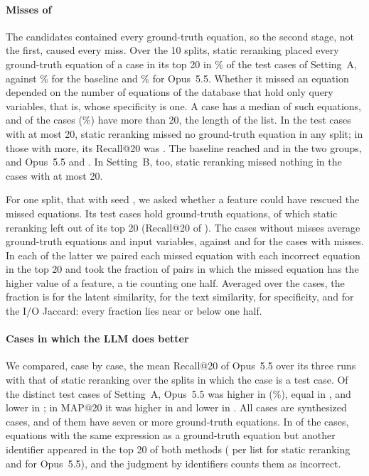 \paragraph{Misses of \ours{}} The candidates contained every ground-truth equation, so
the second stage, not the first, caused every miss. Over the 10 splits, static reranking placed
every ground-truth equation of a case in its top 20 in \PctCompleteAProp\% of the test cases of
Setting~A, against \PctCompleteABase\% for the baseline and \PctCompleteAOpus\% for Opus~5.5.
Whether it missed an equation depended on the number of equations of the database that hold only
query variables, that is, whose specificity is one. A case has a median of \NCovMedianA{} such
equations, and \NCovOverA{} of the \NCases{} cases (\PctCovOverA\%) have more than 20, the length
of the list. In the test cases with at most 20, static reranking missed no ground-truth equation in
any split; in those with more, its Recall@20 was \RecAOverProp. The baseline reached
\RecAWithinBase{} and \RecAOverBase{} in the two groups, and Opus~5.5 \RecAWithinOpus{} and
\RecAOverOpus. In Setting~B, too, static reranking missed nothing in the cases with at most 20.

For one split, that with seed \FirstSeed, we asked whether a feature could have rescued the missed
equations. Its \NErrCases{} test cases hold \NErrGt{} ground-truth equations, of which static
reranking left \NMissed{} out of its top 20 (Recall@20 of \ErrRecall). The \NSolved{} cases without
misses average \MeanKSolved{} ground-truth equations and \MeanInSolved{} input variables, against
\MeanKUnsolved{} and \MeanInUnsolved{} for the \NUnsolved{} cases with misses. In each of the
latter we paired each missed equation with each incorrect equation in the top 20 and took the
fraction of pairs in which the missed equation has the higher value of a feature, a tie counting
one half. Averaged over the cases, the fraction is \RescueLatent{} for the latent similarity,
\RescueText{} for the text similarity, \RescueSpec{} for specificity, and \RescueJac{} for the I/O
Jaccard: every fraction lies near or below one half.

\paragraph{Cases in which the LLM does better} We compared, case by case, the mean Recall@20 of
Opus~5.5 over its three runs with that of static reranking over the splits in which the case is a
test case. Of the \NDistinctA{} distinct test cases of Setting~A, Opus~5.5 was higher in
\NOpusWinRec{} (\ShareOpusWinRec\%), equal in \NOpusTieRec, and lower in \NOpusLossRec; in MAP@20
it was higher in \NOpusWinMap{} and lower in \NOpusLossMap. All \NOpusWinRec{} cases are synthesized
cases, and \NOpusWinSevenPlus{} of them have seven or more ground-truth equations. In
\NOpusWinCopies{} of the \NOpusWinRec{} cases, equations with the same expression as a ground-truth
equation but another identifier appeared in the top 20 of both methods (\CopiesPerListProp{} per
list for static reranking and \CopiesPerListOpus{} for Opus~5.5), and the judgment by identifiers
counts them as incorrect.

